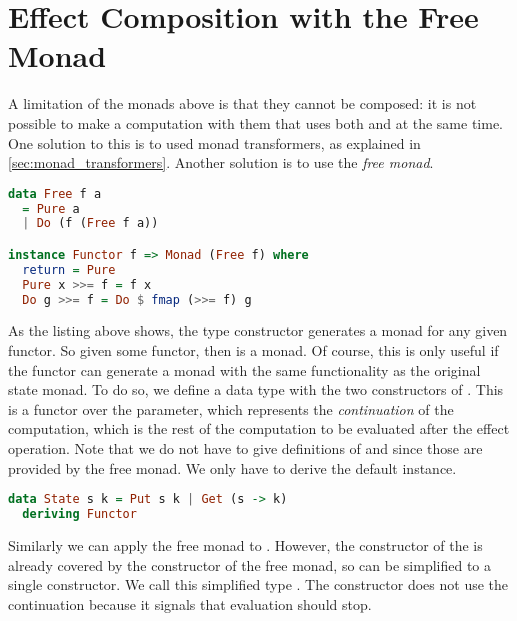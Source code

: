\section{Effect Composition with the Free Monad}


A limitation of the monads above is that they cannot be composed: it is not possible to make a computation with them that uses both  and  at the same time. One solution to this is to used monad transformers, as explained in \cref{sec:monad_transformers}. Another solution is to use the \emph{free monad}.

\begin{lstlisting}[language=haskell,style=fancy]
data Free f a
  = Pure a
  | Do (f (Free f a))

instance Functor f => Monad (Free f) where
  return = Pure
  Pure x >>= f = f x
  Do g >>= f = Do $ fmap (>>= f) g
\end{lstlisting}

As the listing above shows, the  type constructor generates a monad for any given functor. So given some  functor, then  is a monad. Of course, this is only useful if the  functor can generate a monad with the same functionality as the original state monad. To do so, we define a data type with the two constructors of . This is a functor over the  parameter, which represents the \emph{continuation} of the computation, which is the rest of the computation to be evaluated after the effect operation. Note that we do not have to give definitions of  and \hs{>>=} since those are provided by the free monad. We only have to derive the default  instance.

\begin{lstlisting}[language=haskell,style=fancy]
data State s k = Put s k | Get (s -> k)
  deriving Functor
\end{lstlisting}

Similarly we can apply the free monad to . However, the  constructor of the  is already covered by the  constructor of the free monad, so  can be simplified to a single constructor. We call this simplified type . The  constructor does not use the continuation because it signals that evaluation should stop.

